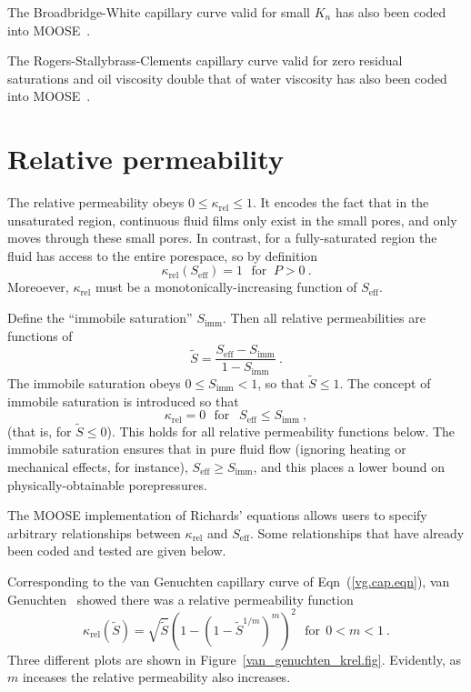 \documentclass[]{scrreprt}
\begin{document}
The Broadbridge-White capillary curve valid for small $K_{n}$ has also been coded into MOOSE~\cite{bw1988}.

The Rogers-Stallybrass-Clements capillary curve valid for zero
residual saturations and oil viscosity double that of water viscosity
has also been coded into MOOSE~\cite{rsc1983}. 

\section{Relative permeability}
\label{rel.perm.sec}

The relative permeability obeys $0\leq \kappa_{\mathrm{rel}} \leq 1$.
It encodes the fact that in the unsaturated region, continuous fluid
films only exist in the small pores, and only moves through these
small pores.  In contrast, for a fully-saturated region the fluid has
access to the entire porespace, so by definition
\begin{equation}
\kappa_{\mathrm{rel}}(S_{\mathrm{eff}}) = 1 \ \ \ \mbox{for }\  P>0
\ .
\label{full.sat.rel.perm.eqn}
\end{equation}
Moreoever, $\kappa_{\mathrm{rel}}$ must be a monotonically-increasing
function of $S_{\mathrm{eff}}$.

Define the ``immobile saturation'' $S_{\mathrm{imm}}$.  Then all
relative permeabilities are functions of
\begin{equation}
\tilde{S} = \frac{S_{\mathrm{eff}} -
  S_{\mathrm{imm}}}{1 - S_{\mathrm{imm}}} \ .
\end{equation}
The immobile saturation obeys $0\leq S_{\mathrm{imm}} < 1$, so that
$\tilde{S} \leq 1$.  The concept of immobile saturation
is introduced so that
\begin{equation}
\kappa_{\mathrm{rel}} = 0 \ \ \ \mbox{for }\ \ S_{\mathrm{eff}} \leq
S_{\mathrm{imm}} \ ,
\end{equation}
(that is, for $\tilde{S}\leq 0$).
This holds for all relative permeability functions below.  The
immobile saturation ensures that in pure fluid flow (ignoring heating
or mechanical effects, for instance), $S_{\mathrm{eff}}\geq
S_{\mathrm{imm}}$, and this places a lower bound on
physically-obtainable porepressures.

The MOOSE implementation of Richards' equations allows users to
specify arbitrary relationships between $\kappa_{\mathrm{rel}}$ and
$S_{\mathrm{eff}}$.  Some relationships that have already been coded
and tested are given below.

Corresponding to the van Genuchten capillary curve of
Eqn~(\ref{vg.cap.eqn}), van Genuchten~\cite{vangenucthen1980} showed
there was a relative permeability function
\begin{equation}
\kappa_{\mathrm{rel}}(\tilde{S}) = \sqrt{\tilde{S}} \left( 1- \left(1 -
\tilde{S}^{1/m}\right)^{m} \right)^{2}
 \ \ \ \mbox{for}\ \ 0<m<1 \ .
\label{vg.krel.eqn}
\end{equation}
Three different plots are shown in
Figure~\ref{van_genuchten_krel.fig}.  Evidently, as $m$ inceases the
relative permeability also increases.
\end{document}
